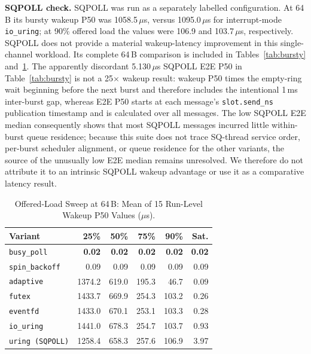 \documentclass[10pt,conference]{IEEEtran}
\begin{document}
\textbf{SQPOLL check.}  SQPOLL was run as a separately labelled configuration.
At 64\,B its bursty wakeup P50 was 1058.5\,$\mu$s, versus 1095.0\,$\mu$s for
interrupt-mode \texttt{io\_uring}; at 90\% offered load the values were
106.9 and 103.7\,$\mu$s, respectively.  SQPOLL does not provide a material
wakeup-latency improvement in this single-channel workload.  Its complete
64\,B comparison is included in Tables~\ref{tab:bursty} and~\ref{tab:offeredload}.
The apparently discordant 5.130\,$\mu$s SQPOLL E2E P50 in
Table~\ref{tab:bursty} is not a 25$\times$ wakeup result: wakeup P50 times the
empty-ring wait beginning before the next burst and therefore includes the
intentional 1\,ms inter-burst gap, whereas E2E P50 starts at each message's
\texttt{slot.send\_ns} publication timestamp and is calculated over all
messages.  The low SQPOLL E2E median consequently shows that most SQPOLL
messages incurred little within-burst queue residence; because this suite does
not trace SQ-thread service order, per-burst scheduler alignment, or queue
residence for the other variants, the source of the unusually low E2E median
remains unresolved.  We therefore do not attribute it to an intrinsic SQPOLL
wakeup advantage or use it as a comparative latency result.

\begin{table}[!t]
  \centering
  \caption{Offered-Load Sweep at 64\,B: Mean of 15 Run-Level Wakeup
    P50 Values ($\mu$s).}
  \label{tab:offeredload}
  \small
  \begin{tabular}{@{}lrrrrr@{}}
    \toprule
    \textbf{Variant} & \textbf{25\%} & \textbf{50\%} & \textbf{75\%} & \textbf{90\%} & \textbf{Sat.} \\
    \midrule
    \texttt{busy\_poll}    & \textbf{0.02} & \textbf{0.02} & \textbf{0.02} & \textbf{0.02} & \textbf{0.02} \\
    \texttt{spin\_backoff} & 0.09   & 0.09   & 0.09   & 0.09   & 0.09  \\
    \texttt{adaptive}      & 1374.2 & 619.0  & 195.3  & 46.7   & 0.09  \\
    \texttt{futex}         & 1433.7 & 669.9  & 254.3  & 103.2  & 0.26  \\
    \texttt{eventfd}       & 1433.0 & 670.1  & 253.1  & 103.3  & 0.28  \\
    \texttt{io\_uring}     & 1441.0 & 678.3  & 254.7  & 103.7  & 0.93  \\
    \midrule
    \texttt{uring (SQPOLL)} & 1258.4 & 658.3 & 257.6 & 106.9 & 3.97 \\
    \bottomrule
  \end{tabular}
\end{table}
\end{document}
